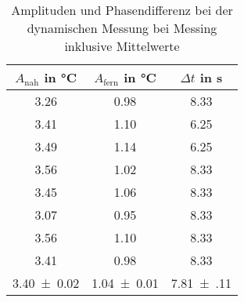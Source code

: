 \begin{table}
\begin{center}
\begin{tabular}{c | c | c}
	$A_\text{nah}$ in \si{\celsius} & $A_\text{fern}$ in \si{\celsius} & $\Delta t$ in \si{\second} \\
\hline
	3.26 & 0.98 & 8.33 \\
	3.41 & 1.10 & 6.25 \\
	3.49 & 1.14 & 6.25 \\
	3.56 & 1.02 & 8.33 \\
	3.45 & 1.06 & 8.33 \\
	3.07 & 0.95 & 8.33 \\
	3.56 & 1.10 & 8.33 \\
	3.41 & 0.98 & 8.33 \\
\hline
	\SI{3.40(2)}{} & \SI{1.04(1)}{} & \SI{7.81(11)}{}
\end{tabular}
\end{center}
\caption{Amplituden und Phasendifferenz bei der dynamischen Messung bei Messing inklusive Mittelwerte}
\label{Amplituden Messing}
\end{table}
